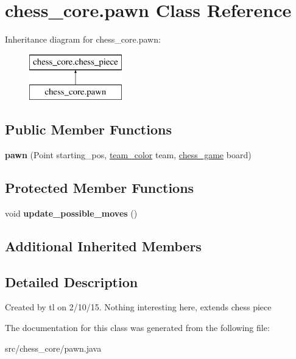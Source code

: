 \hypertarget{classchess__core_1_1pawn}{}\section{chess\+\_\+core.\+pawn Class Reference}
\label{classchess__core_1_1pawn}
Inheritance diagram for chess\+\_\+core.\+pawn\+:\begin{figure}[H]
\begin{center}
\leavevmode
\includegraphics[height=2.000000cm]{classchess__core_1_1pawn}
\end{center}
\end{figure}
\subsection*{Public Member Functions}
\begin{DoxyCompactItemize}
\item 
\hypertarget{classchess__core_1_1pawn_a78b371273a0dee8542b32cb53b82776e}{}{\bfseries pawn} (Point starting\+\_\+pos, \hyperlink{enumchess__core_1_1team__color}{team\+\_\+color} team, \hyperlink{classchess__core_1_1chess__game}{chess\+\_\+game} board)\label{classchess__core_1_1pawn_a78b371273a0dee8542b32cb53b82776e}

\end{DoxyCompactItemize}
\subsection*{Protected Member Functions}
\begin{DoxyCompactItemize}
\item 
\hypertarget{classchess__core_1_1pawn_a12a53bd7aad2887e74754b7815f5d229}{}void {\bfseries update\+\_\+possible\+\_\+moves} ()\label{classchess__core_1_1pawn_a12a53bd7aad2887e74754b7815f5d229}

\end{DoxyCompactItemize}
\subsection*{Additional Inherited Members}


\subsection{Detailed Description}
Created by tl on 2/10/15. Nothing interesting here, extends chess piece 

The documentation for this class was generated from the following file\+:\begin{DoxyCompactItemize}
\item 
src/chess\+\_\+core/pawn.\+java\end{DoxyCompactItemize}
